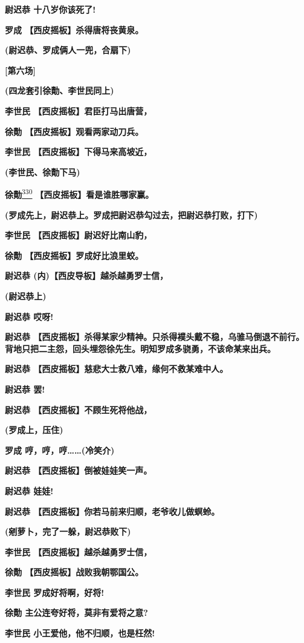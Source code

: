 \textbf{尉迟恭 十八岁你该死了!}

\textbf{罗成 【西皮摇板】杀得唐将丧黄泉。}

\textbf{(尉迟恭、罗成俩人一兜，合扇下)}

\textbf{{[}第六场{]}}

\textbf{(四龙套引徐勣、李世民同上)}

\textbf{李世民 【西皮摇板】君臣打马出唐营，}

\textbf{徐勣 【西皮摇板】观看两家动刀兵。}

\textbf{李世民 【西皮摇板】下得马来高坡近，}

\textbf{(李世民、徐勣下马)}

\textbf{徐勣}\protect\hyperlink{fn330}{\textsuperscript{330}}
\textbf{【西皮摇板】看是谁胜哪家赢。}

\textbf{(罗成先上，尉迟恭上。罗成把尉迟恭勾过去，把尉迟恭打败，打下)}

\textbf{李世民 【西皮摇板】尉迟好比南山豹，}

\textbf{徐勣 【西皮摇板】罗成好比浪里蛟。}

\textbf{尉迟恭 (内)【西皮导板】越杀越勇罗士信，}

\textbf{(尉迟恭上)}

\textbf{尉迟恭 哎呀!}

\textbf{尉迟恭
【西皮摇板】杀得某家少精神。只杀得襆头戴不稳，乌骓马倒退不前行。背地只把二主怨，回头埋怨徐先生。明知罗成多骁勇，不该命某来出兵。}

\textbf{尉迟恭 【西皮摇板】慈悲大士救八难，缘何不救某难中人。}

\textbf{尉迟恭 罢!}

\textbf{尉迟恭 【西皮摇板】不顾生死将他战，}

\textbf{(罗成上，压住)}

\textbf{罗成 哼，哼，哼\ldots{}\ldots{}(冷笑介)}

\textbf{尉迟恭 【西皮摇板】倒被娃娃笑一声。}

\textbf{尉迟恭 娃娃!}

\textbf{尉迟恭 【西皮摇板】你若马前来归顺，老爷收儿做螟蛉。}

\textbf{(剜萝卜，完了一躲，尉迟恭败下)}

\textbf{李世民 【西皮摇板】越杀越勇罗士信，}

\textbf{徐勣 【西皮摇板】战败我朝鄂国公。}

\textbf{李世民 罗成好将啊，好将!}

\textbf{徐勣 主公连夸好将，莫非有爱将之意?}

\textbf{李世民 小王爱他，他不归顺，也是枉然!}

